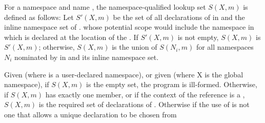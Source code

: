 \pnum
For a namespace  and name , the namespace-qualified lookup set
$S(X, m)$ is defined as follows: Let $S'(X, m)$ be the set of all
declarations of  in  and the inline namespace set of
.
whose potential scope
would include the namespace in which  is declared
at the location of the .
If $S'(X, m)$ is not empty, $S(X, m)$
is $S'(X, m)$; otherwise, $S(X, m)$ is the union of $S(N_i, m)$ for
all namespaces $N_i$ nominated by  in
 and its inline namespace set.

\pnum
Given  (where  is a user-declared namespace), or
given  (where X is the global namespace), if
$S(X, m)$ is the empty set, the program is ill-formed. Otherwise, if
$S(X, m)$ has exactly one member, or if the context of the reference is
a , $S(X, m)$
is the
required set of declarations of . Otherwise if the use of
 is not one that allows a unique declaration to be chosen from
